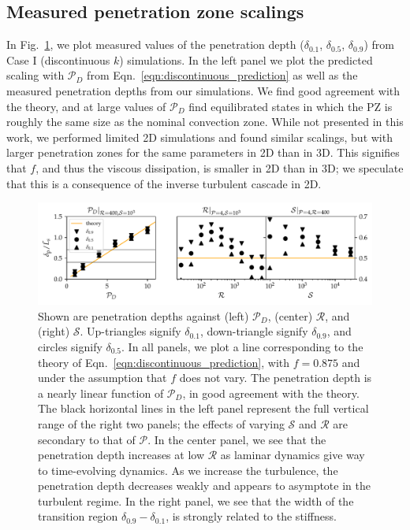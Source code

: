 \documentclass{aastex631}
\newcommand{\mP}{\ensuremath{\mathcal{P}}}
\newcommand{\mR}{\ensuremath{\mathcal{R}}}
\newcommand{\mS}{\ensuremath{\mathcal{S}}}
\begin{document}
\subsection{Measured penetration zone scalings}

In Fig.~\ref{fig:erf_3D_penetration_depths}, we plot measured values of the penetration depth ($\delta_{0.1}$, $\delta_{0.5}$, $\delta_{0.9}$) from Case I (discontinuous $k$) simulations.
In the left panel we plot the predicted scaling with $\mP_D$ from Eqn.~\ref{eqn:discontinuous_prediction} as well as the measured penetration depths from our simulations.
We find good agreement with the theory, and at large values of $\mP_D$ find equilibrated states in which the PZ is roughly the same size as the nominal convection zone.
While not presented in this work, we performed limited 2D simulations and found similar scalings, but with larger penetration zones for the same parameters in 2D than in 3D.
This signifies that $f$, and thus the viscous dissipation, is smaller in 2D than in 3D; we speculate that this is a consequence of the inverse turbulent cascade in 2D.

\begin{figure}[t!]
\centering
\includegraphics[width=\textwidth]{erf_3D_penetration_depths.pdf}
\caption{
Shown are penetration depths against (left) $\mP_D$, (center) $\mR$, and (right) $\mS$.
Up-triangles signify $\delta_{0.1}$, down-triangle signify $\delta_{0.9}$, and circles signify $\delta_{0.5}$.
In all panels, we plot a line corresponding to the theory of Eqn.~\ref{eqn:discontinuous_prediction}, with $f = 0.875$ and under the assumption that $f$ does not vary.
The penetration depth is a nearly linear function of $\mP_D$, in good agreement with the theory.
The black horizontal lines in the left panel represent the full vertical range of the right two panels; the effects of varying $\mS$ and $\mR$ are secondary to that of $\mP$.
In the center panel, we see that the penetration depth increases at low $\mR$ as laminar dynamics give way to time-evolving dynamics.
As we increase the turbulence, the penetration depth decreases weakly and appears to asymptote in the turbulent regime.
In the right panel, we see that the width of the transition region $\delta_{0.9} - \delta_{0.1}$, is strongly related to the stiffness.
\label{fig:erf_3D_penetration_depths}
}
\end{figure}
\end{document}
